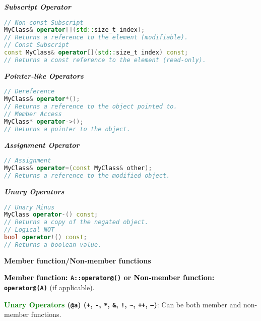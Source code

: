 \documentclass[fontsize=8pt, a4paper, landscape, fleqn]{scrartcl}
\renewcommand{\subsection}[1]{%
    \noindent\colorbox{subsectioncolor}{%
        \parbox{\dimexpr\columnwidth-2\fboxsep}{\color{white}\textbf{#1}}}%
    \vspace{0.5mm}%
}
\renewcommand{\subsubsection}[1]{%
    \noindent\textbf{\textit{\color{subsectioncolor}#1}}%
    \vspace{1mm}%
}
\begin{document}
\begin{multicols*}{3}[\raggedcolumns]
\subsubsection{Subscript Operator}
\begin{lstlisting}[language=C++]
// Non-const Subscript
MyClass& operator[](std::size_t index);
// Returns a reference to the element (modifiable).
// Const Subscript
const MyClass& operator[](std::size_t index) const;
// Returns a const reference to the element (read-only).
\end{lstlisting}

\subsubsection{Pointer-like Operators}
\begin{lstlisting}[language=C++]
// Dereference
MyClass& operator*();
// Returns a reference to the object pointed to.
// Member Access
MyClass* operator->();
// Returns a pointer to the object.
\end{lstlisting}

\subsubsection{Assignment Operator}
\begin{lstlisting}[language=C++]
// Assignment
MyClass& operator=(const MyClass& other);
// Returns a reference to the modified object.
\end{lstlisting}

\subsubsection{Unary Operators}
\begin{lstlisting}[language=C++]
// Unary Minus
MyClass operator-() const;
// Returns a copy of the negated object.
// Logical NOT
bool operator!() const;
// Returns a boolean value.
\end{lstlisting}

\subsection{Member function/Non-member functions}
\textbf{\textcolor{black}{Member function:} \texttt{A::operator@()} or \textcolor{black}{Non-member function:} \texttt{operator@(A)}} (if applicable).

\textbf{\textcolor{green}{Unary Operators} (\texttt{@a}) (\texttt{+}, \texttt{-}, \texttt{*}, \texttt{\&}, \texttt{!}, \texttt{\~}, \texttt{++}, \texttt{--})}:  
Can be both member and non-member functions.


\end{multicols*}
\end{document}
